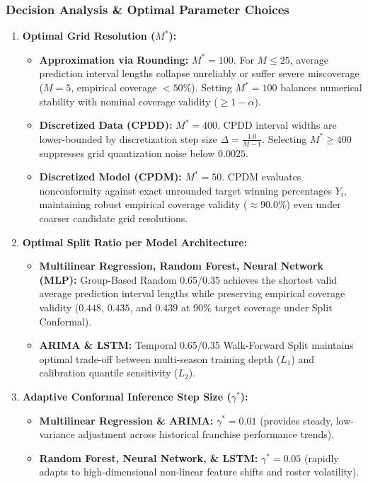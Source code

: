 \documentclass[11pt,a4paper]{article}
\begin{document}
\subsubsection{Decision Analysis \& Optimal Parameter Choices}
\begin{enumerate}
    \item \textbf{Optimal Grid Resolution ($M^*$):}
    \begin{itemize}
        \item \textbf{Approximation via Rounding:} $M^* = 100$. For $M \le 25$, average prediction interval lengths collapse unreliably or suffer severe miscoverage ($M=5$, empirical coverage $< 50\%$). Setting $M^* = 100$ balances numerical stability with nominal coverage validity ($\ge 1-\alpha$).
        \item \textbf{Discretized Data (CPDD):} $M^* = 400$. CPDD interval widths are lower-bounded by discretization step size $\Delta = \frac{1.0}{M-1}$. Selecting $M^* \ge 400$ suppresses grid quantization noise below $0.0025$.
        \item \textbf{Discretized Model (CPDM):} $M^* = 50$. CPDM evaluates nonconformity against exact unrounded target winning percentages $Y_i$, maintaining robust empirical coverage validity ($\approx 90.0\%$) even under coarser candidate grid resolutions.
    \end{itemize}
    \item \textbf{Optimal Split Ratio per Model Architecture:}
    \begin{itemize}
        \item \textbf{Multilinear Regression, Random Forest, Neural Network (MLP):} Group-Based Random 0.65/0.35 achieves the shortest valid average prediction interval lengths while preserving empirical coverage validity ($0.448$, $0.435$, and $0.439$ at $90\%$ target coverage under Split Conformal).
        \item \textbf{ARIMA \& LSTM:} Temporal 0.65/0.35 Walk-Forward Split maintains optimal trade-off between multi-season training depth ($L_1$) and calibration quantile sensitivity ($L_2$).
    \end{itemize}
    \item \textbf{Adaptive Conformal Inference Step Size ($\gamma^*$):}
    \begin{itemize}
        \item \textbf{Multilinear Regression \& ARIMA:} $\gamma^* = 0.01$ (provides steady, low-variance adjustment across historical franchise performance trends).
        \item \textbf{Random Forest, Neural Network, \& LSTM:} $\gamma^* = 0.05$ (rapidly adapts to high-dimensional non-linear feature shifts and roster volatility).
    \end{itemize}
\end{enumerate}
\end{document}
